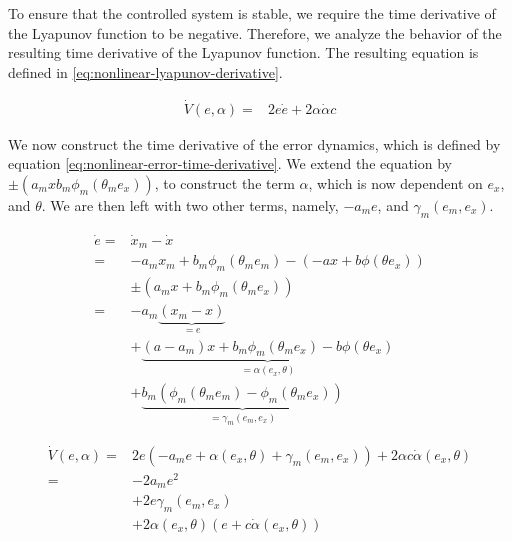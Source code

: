 To ensure that the controlled system is stable, we require the time derivative of the Lyapunov function to be negative. Therefore, we analyze the behavior of the resulting time derivative of the Lyapunov function. The resulting equation is defined in \eqref{eq:nonlinear-lyapunov-derivative}.

\begin{equation}
    \begin{aligned}
    \dot V(e, \alpha) = & 2e\dot e + 2\alpha \dot \alpha c
    \end{aligned}
    \label{eq:nonlinear-lyapunov-derivative}
\end{equation}

We now construct the time derivative of the error dynamics, which is defined by equation \eqref{eq:nonlinear-error-time-derivative}. We extend the equation by $\pm (a_mx b_m \phi_m(\theta_m e_x))$, to construct the term $\alpha$, which is now dependent on $e_x$, and $\theta$. We are then left with two other terms, namely, $-a_me$, and $\gamma_m(e_m, e_x)$.

\begin{equation}
    \begin{aligned}
    \dot e 
= & \dot x_m - \dot x \\ 
= & -a_mx_m + b_m\phi_m(\theta_me_m) - (-ax + b\phi(\theta e_x)) \\
    & \pm (a_mx + b_m \phi_m(\theta_m e_x)) \\
    = & -a_m \underbrace{(x_m-x)}_{=e} \\ 
    & + \underbrace{(a-a_m)x+b_m\phi_m(\theta_me_x) - b\phi(\theta e_x)}_{=\alpha(e_x, \theta)} \\ 
    & + \underbrace{b_m(\phi_m(\theta_m e_m)-\phi_m(\theta_m e_x))}_{=\gamma_m(e_m,e_x)}
    \end{aligned}
    \label{eq:nonlinear-error-time-derivative}
\end{equation}

\begin{equation}
    \begin{aligned}
    \dot V(e, \alpha) 
    = & 2e(-a_me + \alpha(e_x, \theta) + \gamma_m(e_m, e_x)) + 2\alpha c \dot \alpha(e_x, \theta)\\
    = & -2a_me^2 \\ 
    & + 2e\gamma_m(e_m, e_x) 
    \\ 
    & + 2\alpha(e_x, \theta)(e + c \dot \alpha(e_x, \theta))
    \end{aligned}
    \label{eq:nonlinear-lyapunov-derivative2}
\end{equation}

